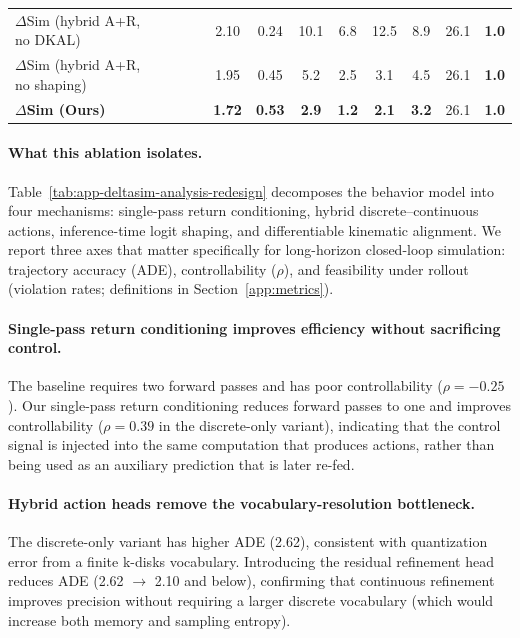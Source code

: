 \documentclass{article}
\newcommand{\cmark}{\textcolor{mydarkgray}{\ding{51}}}
\newcommand{\xmark}{\textcolor{mylightgray}{\ding{55}}}
\newcommand{\best}[1]{\textbf{#1}}
\theoremstyle{plain}
\theoremstyle{definition}
\theoremstyle{remark}
\begin{document}
\begin{table}[ht]
\begin{threeparttable}
\begin{tabular}{@{}l cccc cc cccc cc@{}}
\(\Delta\)Sim (hybrid A+R, no DKAL)
& \cmark & \cmark & \cmark & \xmark
& 2.10 & 0.24 & 10.1 & 6.8 & 12.5 & 8.9 & 26.1 & \best{1.0} \\

\(\Delta\)Sim (hybrid A+R, no shaping)
& \cmark & \cmark & \xmark & \cmark
& 1.95 & 0.45 & 5.2 & 2.5 & 3.1 & 4.5 & 26.1 & \best{1.0} \\

\rowcolor{oursrow}
\textbf{\(\Delta\)Sim (Ours)}
& \cmark & \cmark & \cmark & \cmark
& \best{1.72} & \best{0.53} & \best{2.9} & \best{1.2} & \best{2.1} & \best{3.2} & 26.1 & \best{1.0} \\

\bottomrule
\end{tabular}
\end{threeparttable}
\end{table}

\paragraph{What this ablation isolates.}
Table~\ref{tab:app-deltasim-analysis-redesign} decomposes the behavior model into four mechanisms:
single-pass return conditioning, hybrid discrete--continuous actions, inference-time logit shaping, and differentiable kinematic alignment.
We report three axes that matter specifically for long-horizon closed-loop simulation:
trajectory accuracy (ADE), controllability (\(\rho\)), and feasibility under rollout (violation rates; definitions in Section~\ref{app:metrics}).

\paragraph{Single-pass return conditioning improves efficiency without sacrificing control.}
The baseline requires two forward passes and has poor controllability (\(\rho=-0.25\)).
Our single-pass return conditioning reduces forward passes to one and improves controllability (\(\rho=0.39\) in the discrete-only variant),
indicating that the control signal is injected into the same computation that produces actions, rather than being used as an auxiliary prediction that is later re-fed.

\paragraph{Hybrid action heads remove the vocabulary-resolution bottleneck.}
The discrete-only variant has higher ADE (2.62), consistent with quantization error from a finite k-disks vocabulary.
Introducing the residual refinement head reduces ADE (2.62 \(\rightarrow\) 2.10 and below), confirming that continuous refinement improves precision
without requiring a larger discrete vocabulary (which would increase both memory and sampling entropy).
\end{document}
